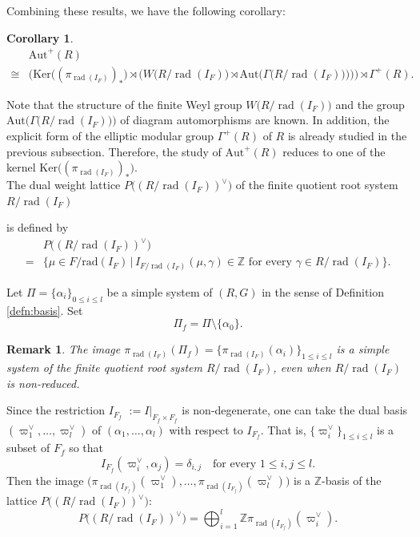 \documentclass[11pt]{amsart}
\newcommand{\Z}{\mathbb{Z}}
\newtheorem{cor}[thm]{Corollary}%
\newtheorem{rem}[thm]{Remark}%
\newcommand{\rad}{\operatorname{rad}}
\begin{document}
{Combining these results, we have the following corollary:
\begin{cor}\label{cor:normal}
\begin{equation*}\label{eqn:normal} 
\begin{split}
&\mathrm{Aut}^+(R)\\
\cong 
&\bigg(\mathrm{Ker}\bigl((\pi_{\rad(I_F)})_* \bigr)\rtimes 
\Big(W\big(R/\rad(I_F)\big)\rtimes \mathrm{Aut}\big(\Gamma\big(R/\rad (I_F)\big)\big)\Big)
\bigg)\rtimes \Gamma^+(R).
\end{split}
\end{equation*}
\end{cor}
{
Note that the structure of the finite Weyl group $W\big(R/\rad (I_F)\big)$ and the group 
$\mathrm{Aut}\big(\Gamma\big(R/\rad (I_F)\big)\big)$ of diagram automorphisms are 
known. In addition, the explicit form of the elliptic modular group $\Gamma^+(R)$ of 
$R$ is already studied in the previous subsection. Therefore, 
the study of $\mathrm{Aut}^+(R)$ reduces to one of the kernel 
$\mathrm{Ker}\bigl((\pi_{\rad(I_F)})_* \bigr)$.  }\\

The dual weight lattice $P\big((R/\rad (I_F))^{\vee}\big)$
of the finite quotient root system $R/\rad(I_F)$} is defined by
\begin{align*}
& P\big((R/\rad (I_F))^{\vee}\big) \\
=
&\big\{\mu\in F/\mathrm{rad}(I_F)\,\big|\, I_{F/\rad(I_F)}(\mu,\gamma)\in \Z 
\mbox{ for every }\gamma\in R/\rad(I_F)\big\}.
\end{align*}

Let $\Pi=\{\alpha_i\}_{0\leq i\leq l}$ be a simple system of $(R,G)$ in the sense of 
Definition \ref{defn:basis}. Set
\[\Pi_f=\Pi\setminus \{\alpha_0\}.\]

\begin{rem}\label{rem:simple-system-Pif}
{\rm The image $\pi_{\rad(I_F)}(\Pi_f)=
\big\{\pi_{\rad(I_F)}(\alpha_i)\big\}_{1\leq i\leq l}$ is a simple system of the finite 
quotient root system $R/\rad(I_F)$, even when $R/\rad(I_F)$ is non-reduced. 
}\end{rem}

Since the restriction $I_{F_f}$ $:=I\big|_{F_f\times F_f}$  is non-degenerate, one can take the
dual basis $(\varpi_1^\vee,\ldots,\varpi_l^\vee)$ of $(\alpha_1,\ldots,\alpha_l)$
with respect to $I_{F_f}$. That is, $\{\varpi_i^\vee\}_{1\leq i\leq l}$  is a subset of $F_f$
so that 
\[I_{F_f}(\varpi_i^\vee,\alpha_j)=\delta_{i,j}\quad \text{for every }1\leq i,j\leq l.\]
Then  the image $\big(\pi_{\rad(I_{F_f})}(\varpi_1^\vee),\ldots,
\pi_{\rad(I_{F_f})}(\varpi_l^\vee)\big)$ is a $\Z$-basis of the lattice 
$P\big((R/\rad (I_F))^{\vee}\big)$:
\[P\big((R/\rad (I_F))^{\vee}\big)=\bigoplus_{i=1}^l \Z \pi_{\rad(I_{F_f})}(\varpi_i^\vee).\]
\end{document}
